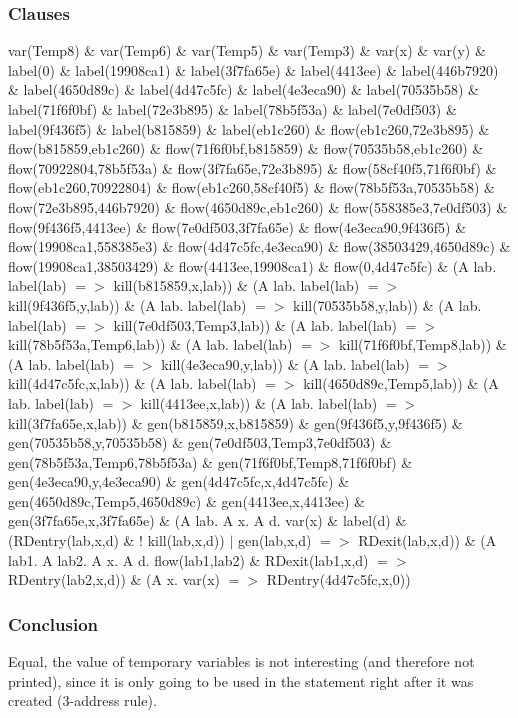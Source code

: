 \documentclass{report}
\begin{document}
\subsubsection{Clauses}
var(Temp8) \& var(Temp6) \& var(Temp5) \& var(Temp3) \& var(x) \& var(y) \& 
label(0) \& label(19908ca1) \& label(3f7fa65e) \& label(4413ee) \& label(446b7920) \& label(4650d89c) \& label(4d47c5fc) \& label(4e3eca90) \& label(70535b58) \& label(71f6f0bf) \& label(72e3b895) \& label(78b5f53a) \& label(7e0df503) \& label(9f436f5) \& label(b815859) \& label(eb1c260) \& 
flow(eb1c260,72e3b895) \& flow(b815859,eb1c260) \& flow(71f6f0bf,b815859) \& flow(70535b58,eb1c260) \& flow(70922804,78b5f53a) \& flow(3f7fa65e,72e3b895) \& flow(58cf40f5,71f6f0bf) \& flow(eb1c260,70922804) \& flow(eb1c260,58cf40f5) \& flow(78b5f53a,70535b58) \& flow(72e3b895,446b7920) \& flow(4650d89c,eb1c260) \& flow(558385e3,7e0df503) \& flow(9f436f5,4413ee) \& flow(7e0df503,3f7fa65e) \& flow(4e3eca90,9f436f5) \& flow(19908ca1,558385e3) \& flow(4d47c5fc,4e3eca90) \& flow(38503429,4650d89c) \& flow(19908ca1,38503429) \& flow(4413ee,19908ca1) \& flow(0,4d47c5fc) \& 
(A lab. label(lab) $=>$ kill(b815859,x,lab)) \& (A lab. label(lab) $=>$ kill(9f436f5,y,lab)) \& (A lab. label(lab) $=>$ kill(70535b58,y,lab)) \& (A lab. label(lab) $=>$ kill(7e0df503,Temp3,lab)) \& (A lab. label(lab) $=>$ kill(78b5f53a,Temp6,lab)) \& (A lab. label(lab) $=>$ kill(71f6f0bf,Temp8,lab)) \& (A lab. label(lab) $=>$ kill(4e3eca90,y,lab)) \& (A lab. label(lab) $=>$ kill(4d47c5fc,x,lab)) \& (A lab. label(lab) $=>$ kill(4650d89c,Temp5,lab)) \& (A lab. label(lab) $=>$ kill(4413ee,x,lab)) \& (A lab. label(lab) $=>$ kill(3f7fa65e,x,lab)) \& 
gen(b815859,x,b815859) \& gen(9f436f5,y,9f436f5) \& gen(70535b58,y,70535b58) \& gen(7e0df503,Temp3,7e0df503) \& gen(78b5f53a,Temp6,78b5f53a) \& gen(71f6f0bf,Temp8,71f6f0bf) \& gen(4e3eca90,y,4e3eca90) \& gen(4d47c5fc,x,4d47c5fc) \& gen(4650d89c,Temp5,4650d89c) \& gen(4413ee,x,4413ee) \& gen(3f7fa65e,x,3f7fa65e) \& 
(A lab. A x. A d. var(x) \& label(d) \& (RDentry(lab,x,d) \& ! kill(lab,x,d)) $|$ gen(lab,x,d) $=>$ RDexit(lab,x,d)) \& 
(A lab1. A lab2. A x. A d. flow(lab1,lab2) \& RDexit(lab1,x,d) $=>$ RDentry(lab2,x,d)) \& 
(A x. var(x) $=>$ RDentry(4d47c5fc,x,0))
\subsubsection{Conclusion}
Equal, the value of temporary variables is not interesting (and therefore not printed), since it is only going to be used in the statement right after it was created (3-address rule).
\end{document}
